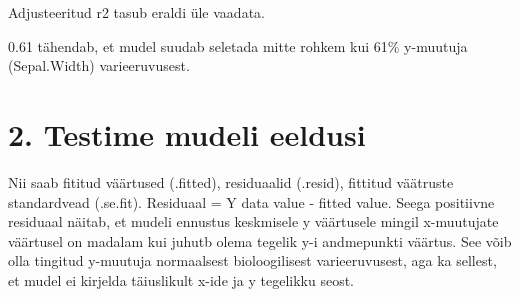 \documentclass[]{book}
\newenvironment{Shaded}{\begin{snugshade}}{\end{snugshade}}
\newcommand{\KeywordTok}[1]{\textcolor[rgb]{0.13,0.29,0.53}{\textbf{#1}}}
\newcommand{\DataTypeTok}[1]{\textcolor[rgb]{0.13,0.29,0.53}{#1}}
\newcommand{\StringTok}[1]{\textcolor[rgb]{0.31,0.60,0.02}{#1}}
\newcommand{\CommentTok}[1]{\textcolor[rgb]{0.56,0.35,0.01}{\textit{#1}}}
\newcommand{\OperatorTok}[1]{\textcolor[rgb]{0.81,0.36,0.00}{\textbf{#1}}}
\newcommand{\NormalTok}[1]{#1}
\begin{document}
\begin{Shaded}
\end{Shaded}

Adjusteeritud r2 tasub eraldi üle vaadata.

\begin{Shaded}
\end{Shaded}

0.61 tähendab, et mudel suudab seletada mitte rohkem kui 61\% y-muutuja
(Sepal.Width) varieeruvusest.

\section*{2. Testime mudeli eeldusi}\label{testime-mudeli-eeldusi}

Nii saab fititud väärtused (.fitted), residuaalid (.resid), fittitud
väätruste standardvead (.se.fit). Residuaal = Y data value - fitted
value. Seega positiivne residuaal näitab, et mudeli ennustus keskmisele
y väärtusele mingil x-muutujate väärtusel on madalam kui juhutb olema
tegelik y-i andmepunkti väärtus. See võib olla tingitud y-muutuja
normaalsest bioloogilisest varieeruvusest, aga ka sellest, et mudel ei
kirjelda täiuslikult x-ide ja y tegelikku seost.
\end{document}
